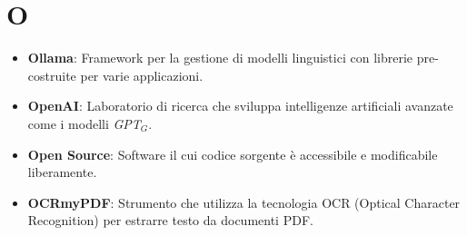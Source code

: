 \section{O}
\begin{itemize}
    \item \textbf{Ollama}: Framework per la gestione di modelli linguistici con librerie pre-costruite per varie applicazioni.
    \item \textbf{OpenAI}: Laboratorio di ricerca che sviluppa intelligenze artificiali avanzate come i modelli \textit{GPT}$_G$.
    \item \textbf{Open Source}: Software il cui codice sorgente è accessibile e modificabile liberamente.
    \item \textbf{OCRmyPDF}: Strumento che utilizza la tecnologia OCR (Optical Character Recognition) per estrarre testo da documenti PDF.
\end{itemize}
